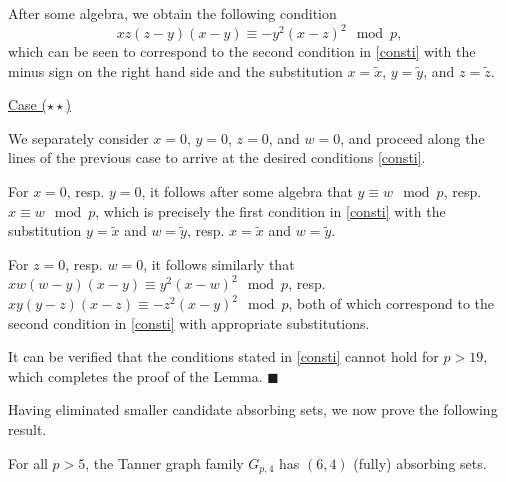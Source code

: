 After some algebra, we obtain the following condition
\begin{equation}
xz(z-y)(x-y) \equiv -y^2(x-z)^2 \mod p,
\end{equation}
which can be seen to correspond to the second condition in
\eqref{consti} with the minus sign on the right hand side and the
substitution $x=\tilde{x}$, $y=\tilde{y}$, and $z=\tilde{z}$.

\underline{Case ($\star\star$)}

We separately consider $x=0$, $y=0$, $z=0$, and $w=0$, and proceed
along the lines of the previous case to arrive at the desired
conditions \eqref{consti}.

For $x=0$, resp. $y=0$, it follows after some algebra that $y \equiv
w \mod p$, resp. $x \equiv w \mod p$, which is precisely the first
condition in \eqref{consti} with the substitution $y=\tilde{x}$ and
$w=\tilde{y}$, resp. $x=\tilde{x}$ and $w=\tilde{y}$.


For $z=0$, resp. $w=0$, it follows similarly that $xw(w-y)(x-y)
\equiv y^2(x-w)^2 \mod p$, resp. $xy(y-z)(x-z) \equiv -z^2(x-y)^2
\mod p$, both of which correspond to the second condition in
\eqref{consti} with appropriate substitutions.


It can be verified that the conditions stated in \eqref{consti}
cannot hold for $p>19$, which completes the proof of the Lemma.
\hfill$\blacksquare$

Having eliminated smaller candidate absorbing sets, we now prove the
following result.

\begin{lemma}\label{Lem5} For all $p > 5$, the Tanner graph family $G_{p,4}$ has $(6,4)$ (fully) absorbing
sets.
\end{lemma}

